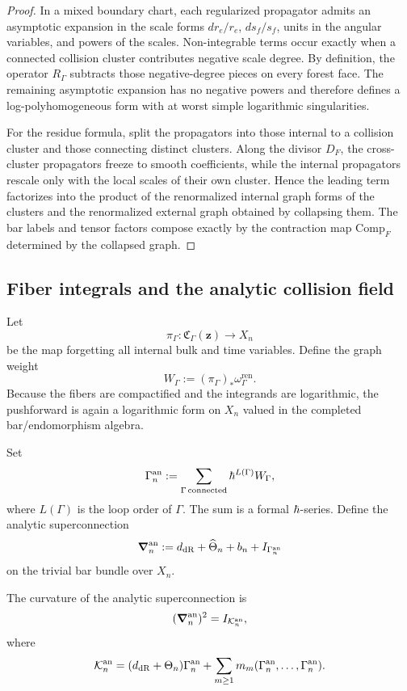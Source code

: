 \begin{proof}
In a mixed boundary chart, each regularized propagator admits an asymptotic expansion in the scale forms $dr_e/r_e$, $ds_f/s_f$, units in the angular variables, and powers of the scales. Non-integrable terms occur exactly when a connected collision cluster contributes negative scale degree. By definition, the operator $R_\Gamma$ subtracts those negative-degree pieces on every forest face. The remaining asymptotic expansion has no negative powers and therefore defines a log-polyhomogeneous form with at worst simple logarithmic singularities.

For the residue formula, split the propagators into those internal to a collision cluster and those connecting distinct clusters. Along the divisor $D_F$, the cross-cluster propagators freeze to smooth coefficients, while the internal propagators rescale only with the local scales of their own cluster. Hence the leading term factorizes into the product of the renormalized internal graph forms of the clusters and the renormalized external graph obtained by collapsing them. The bar labels and tensor factors compose exactly by the contraction map $\mathrm{Comp}_F$ determined by the collapsed graph.
\end{proof}

\subsection{Fiber integrals and the analytic collision field}
Let
\[
 \pi_\Gamma : \mathfrak C_\Gamma(\mathbf z) \longrightarrow X_n
\]
be the map forgetting all internal bulk and time variables. Define the graph weight
\[
 W_\Gamma := (\pi_\Gamma)_*\omega_\Gamma^{\mathrm{ren}}.
\]
Because the fibers are compactified and the integrands are logarithmic, the pushforward is again a logarithmic form on $X_n$ valued in the completed bar/endomorphism algebra.

Set
\[
 \Gamma_n^{\mathrm{an}} := \sum_{\Gamma\,\mathrm{connected}} \hbar^{L(\Gamma)}W_\Gamma,
\]
where $L(\Gamma)$ is the loop order of $\Gamma$. The sum is a formal $\hbar$-series. Define the analytic superconnection
\[
 \boldsymbol{\nabla}_n^{\mathrm{an}} := d_{\mathrm{dR}}+\widehat\Theta_n+b_n+I_{\Gamma_n^{\mathrm{an}}}
\]
on the trivial bar bundle over $X_n$.

\begin{theorem}%
The curvature of the analytic superconnection is
\[
 (\boldsymbol{\nabla}_n^{\mathrm{an}})^2 = I_{\mathcal K_n^{\mathrm{an}}},
\]
where
\[
 \mathcal K_n^{\mathrm{an}}
 =
 (d_{\mathrm{dR}}+\Theta_n)\Gamma_n^{\mathrm{an}}
 +
 \sum_{m\ge 1}m_m(\Gamma_n^{\mathrm{an}},\dots,\Gamma_n^{\mathrm{an}}).
\]
\end{theorem}

